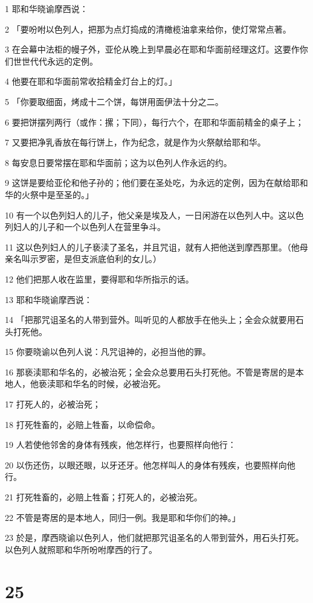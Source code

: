 \par 1 耶和华晓谕摩西说：
\par 2 「要吩咐以色列人，把那为点灯捣成的清橄榄油拿来给你，使灯常常点著。
\par 3 在会幕中法柜的幔子外，亚伦从晚上到早晨必在耶和华面前经理这灯。这要作你们世世代代永远的定例。
\par 4 他要在耶和华面前常收拾精金灯台上的灯。」
\par 5 「你要取细面，烤成十二个饼，每饼用面伊法十分之二。
\par 6 要把饼摆列两行（或作：摞；下同），每行六个，在耶和华面前精金的桌子上；
\par 7 又要把净乳香放在每行饼上，作为纪念，就是作为火祭献给耶和华。
\par 8 每安息日要常摆在耶和华面前；这为以色列人作永远的约。
\par 9 这饼是要给亚伦和他子孙的；他们要在圣处吃，为永远的定例，因为在献给耶和华的火祭中是至圣的。」
\par 10 有一个以色列妇人的儿子，他父亲是埃及人，一日闲游在以色列人中。这以色列妇人的儿子和一个以色列人在营里争斗。
\par 11 这以色列妇人的儿子亵渎了圣名，并且咒诅，就有人把他送到摩西那里。（他母亲名叫示罗密，是但支派底伯利的女儿。）
\par 12 他们把那人收在监里，要得耶和华所指示的话。
\par 13 耶和华晓谕摩西说：
\par 14 「把那咒诅圣名的人带到营外。叫听见的人都放手在他头上；全会众就要用石头打死他。
\par 15 你要晓谕以色列人说：凡咒诅神的，必担当他的罪。
\par 16 那亵渎耶和华名的，必被治死；全会众总要用石头打死他。不管是寄居的是本地人，他亵渎耶和华名的时候，必被治死。
\par 17 打死人的，必被治死；
\par 18 打死牲畜的，必赔上牲畜，以命偿命。
\par 19 人若使他邻舍的身体有残疾，他怎样行，也要照样向他行：
\par 20 以伤还伤，以眼还眼，以牙还牙。他怎样叫人的身体有残疾，也要照样向他行。
\par 21 打死牲畜的，必赔上牲畜；打死人的，必被治死。
\par 22 不管是寄居的是本地人，同归一例。我是耶和华你们的神。」
\par 23 於是，摩西晓谕以色列人，他们就把那咒诅圣名的人带到营外，用石头打死。以色列人就照耶和华所吩咐摩西的行了。

\chapter{25}

